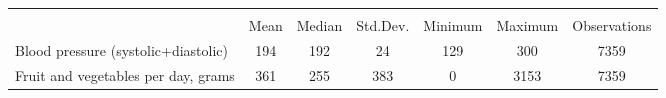 \begin{tabular}{l*{1}{cccccc}}
\hline\hline
                    &\multicolumn{6}{c}{}                                                         \\
                    &        Mean&      Median&    Std.Dev.&     Minimum&     Maximum&Observations\\
\hline
Blood pressure (systolic+diastolic)&         194&         192&          24&         129&         300&        7359\\
Fruit and vegetables per day, grams&         361&         255&         383&           0&        3153&        7359\\
\hline\hline
\end{tabular}

